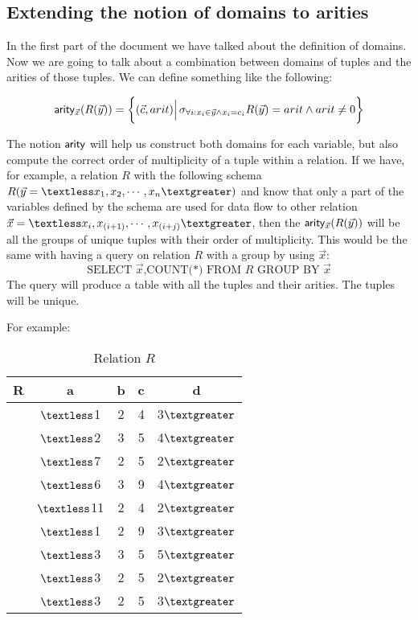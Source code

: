 \documentclass[12pt]{article}
\begin{document}
\subsection{Extending the notion of domains to arities}

In the first part of the document we have talked about the definition of domains. Now we are going to talk about a combination between domains of tuples and the arities of those tuples. We can define something like the following:

$$\textsf{arity}{}_{\vec x}(R(\vec y))=\bigg\{(\vec c,arit)\Big|\,\sigma_{\forall i:x_i\in\vec{y}\land x_{i}=c_{i}}R(\vec y)= arit \land arit \not= 0\bigg\}$$ 

The notion $\textsf{arity}{}$ will help us construct both domains for each variable, but also compute the correct order of multiplicity of a tuple within a relation. If we have, for example, a relation $R$ with the following schema $R(\vec y=\textless x_1,x_2,\cdots,x_n\textgreater)$ and know that only a part of the variables defined by the schema are used for data flow to other relation $\vec x=\textless x_i,x_{(i+1)},\cdots,x_{(i+j)}\textgreater$, then the $\textsf{arity}{}_{\vec x}(R(\vec y))$ will be all the groups of unique tuples with their order of multiplicity. This would be the same with having a query on relation $R$ with a group by using $\vec x$:
$$\mbox{SELECT }\vec{x} \mbox{,COUNT(*) FROM }R \mbox{ GROUP BY }\vec{x}$$
The query will produce a table with all the tuples and their arities. The tuples will be unique.

For example:

\begin{table}[H]
\centering
\begin{tabular}{c c c c c}
	R & a & b & c & d\\ [0.2ex]
	\hline
	  & $\textless $1 & 2 & 4& 3$\textgreater$\\
	  & $\textless $2 & 3 & 5 & 4$\textgreater$\\
	  & $\textless $7 & 2 & 5 & 2$\textgreater$\\
	  & $\textless $6 & 3 & 9 & 4$\textgreater$\\
	  & $\textless $11 & 2 & 4 & 2$\textgreater$\\
	  & $\textless $1 & 2 & 9 & 3$\textgreater$\\
	  & $\textless $3 & 3 & 5 & 5$\textgreater$\\
	  & $\textless $3 & 2 & 5 & 2$\textgreater$\\
	  & $\textless $3 & 2 & 5 & 3$\textgreater$\\
\end{tabular}
\caption{Relation $R$}
\end{table}
\end{document}
